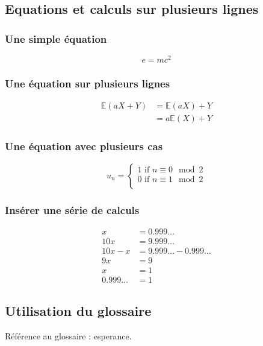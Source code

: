 \begin{definition}
    \lipsum[1][1-4]
\end{definition}

\begin{remark}
    \lipsum[1][1-4]
\end{remark}

\begin{lemma}
    \lipsum[1][1-4]
\end{lemma}


\subsection{Equations et calculs sur plusieurs lignes}

\subsubsection*{Une simple équation}
\begin{equation}
    e = mc^2
\end{equation}

\subsubsection*{Une équation sur plusieurs lignes}
\begin{equation}
    \begin{split}
        \mathbb{E}(aX + Y) &= \mathbb{E}(aX) + Y\\
                           &= a\mathbb{E}(X) + Y
    \end{split}
\end{equation}

\subsubsection*{Une équation avec plusieurs cas}
\begin{equation}
    u_n =
    \begin{cases}
        1 \text{ if } n\equiv0 \mod 2\\
        0 \text{ if } n\equiv1 \mod 2 \\
    \end{cases}
\end{equation}

\subsubsection*{Insérer une série de calculs}
\begin{align*}
    x &= 0.999\ldots \\
    10x &= 9.999\ldots \\
    10x - x &= 9.999\ldots - 0.999\ldots \\
    9x &= 9 \\
    x &= 1 \\
    0.999\ldots &= 1
\end{align*}

\subsection{Utilisation du glossaire}



Référence au glossaire : \gls{esperance}.  




